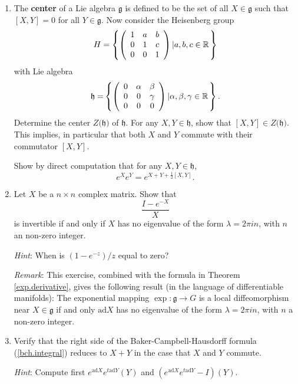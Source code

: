 \documentclass{amsbook}
\let \frak = \mathfrak
\theoremstyle{plain}
\numberwithin{equation}{chapter}
\numberwithin{theorem}{chapter}
\begin{document}
\begin{enumerate}
\item \label{bch.special}The \textbf{center} of a Lie algebra $\frak{g}$ is
defined to be the set of all $X\in\frak{g}$ such that $\left[  X,Y\right]  =0$
for all $Y\in\frak{g}$. Now consider the Heisenberg group
\[
H=\left\{  \left(
\begin{array}
[c]{ccc}%
1 & a & b\\
0 & 1 & c\\
0 & 0 & 1
\end{array}
\right)  \left|  a,b,c\in\mathbb{R}\right.  \right\}
\]
with Lie algebra
\[
\frak{h=}\left\{  \left(
\begin{array}
[c]{ccc}%
0 & \alpha & \beta\\
0 & 0 & \gamma\\
0 & 0 & 0
\end{array}
\right)  \left|  \alpha,\beta,\gamma\in\mathbb{R}\right.  \right\}  \text{.}%
\]
Determine the center $Z(\frak{h)}$ of $\frak{h}$. For any $X,Y\in\frak{h}$,
show that $[X,Y]\in Z(\frak{h)}$. This implies, in particular that both $X$
and $Y$ commute with their commutator $[X,Y]$.

Show by direct computation that for any $X,Y\in\frak{h}$,
\begin{equation}
e^{X}e^{Y}=e^{X+Y+\tfrac{1}{2}[X,Y]}\text{.}\label{terminate}%
\end{equation}

\item  Let $X$ be a $n\times n$ complex matrix. Show that
\[
\frac{I-e^{-X}}{X}%
\]
is invertible if and only if $X$ has no eigenvalue of the form $\lambda=2\pi
in$, with $n$ an non-zero integer.

\textit{Hint}: When is $\left(  1-e^{-z}\right)  /z$ equal to zero?

\textit{Remark}: This exercise, combined with the formula in Theorem
\ref{exp.derivative}, gives the following result (in the language of
differentiable manifolds): The exponential mapping $\exp:\frak{g}\rightarrow
G$ is a local diffeomorphism near $X\in\frak{g}$ if and only $\mathrm{ad}X$
has no eigenvalue of the form $\lambda=2\pi in$, with $n$ a non-zero integer.

\item \label{bch.commute}Verify that the right side of the
Baker-Campbell-Hausdorff formula (\ref{bch.integral}) reduces to $X+Y$ in the
case that $X$ and $Y$ commute.

\textit{Hint}: Compute first $e^{\mathrm{ad}X}e^{t\mathrm{ad}Y}(Y)$ and
$\left(  e^{\mathrm{ad}X}e^{t\mathrm{ad}Y}-I\right)  (Y)$.


\end{enumerate}
\end{document}
